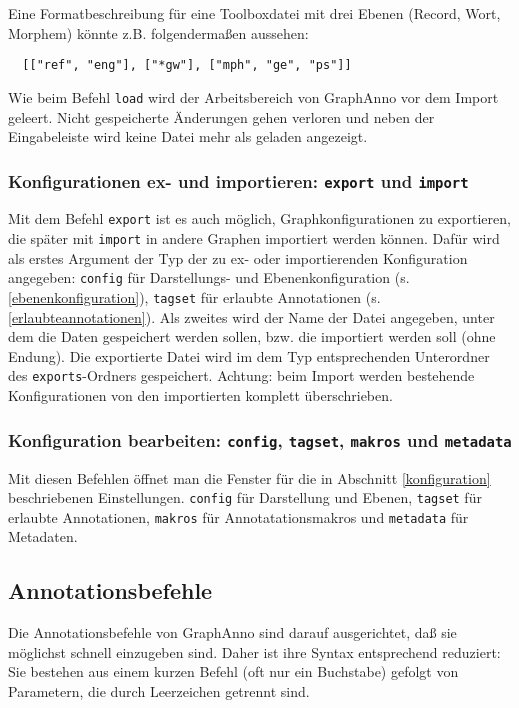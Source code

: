 \documentclass[12pt]{scrartcl}
\begin{document}
Eine Formatbeschreibung für eine Toolboxdatei mit drei Ebenen (Record, Wort, Morphem) könnte z.B. folgendermaßen aussehen:
\begin{verbatim}
  [["ref", "eng"], ["*gw"], ["mph", "ge", "ps"]]
\end{verbatim}

Wie beim Befehl \texttt{load} wird der Arbeitsbereich von GraphAnno vor dem Import geleert. Nicht gespeicherte Änderungen gehen verloren und neben der Eingabeleiste wird keine Datei mehr als geladen angezeigt.


\subsubsection{Konfigurationen ex- und importieren: \texttt{export} und \texttt{import}}

Mit dem Befehl \texttt{export} ist es auch möglich, Graphkonfigurationen zu exportieren, die später mit \texttt{import} in andere Graphen importiert werden können. Dafür wird als erstes Argument der Typ der zu ex- oder importierenden Konfiguration angegeben: \texttt{config} für Darstellungs- und Ebenenkonfiguration (s. \ref{ebenenkonfiguration}), \texttt{tagset} für erlaubte Annotationen (s. \ref{erlaubteannotationen}). Als zweites wird der Name der Datei angegeben, unter dem die Daten gespeichert werden sollen, bzw. die importiert werden soll (ohne Endung). Die exportierte Datei wird im dem Typ entsprechenden Unterordner des \texttt{exports}-Ordners gespeichert. Achtung: beim Import werden bestehende Konfigurationen von den importierten komplett überschrieben.


\subsubsection{Konfiguration bearbeiten: \texttt{config}, \texttt{tagset}, \texttt{makros} und \texttt{metadata}}

Mit diesen Befehlen öffnet man die Fenster für die in Abschnitt \ref{konfiguration} beschriebenen Einstellungen. \texttt{config} für Darstellung und Ebenen, \texttt{tagset} für erlaubte Annotationen, \texttt{makros} für Annotatationsmakros und \texttt{metadata} für Metadaten.


\subsection{Annotationsbefehle}\label{annotationsbefehle}

Die Annotationsbefehle von GraphAnno sind darauf ausgerichtet, daß sie möglichst schnell einzugeben sind. Daher ist ihre Syntax entsprechend reduziert: Sie bestehen aus einem kurzen Befehl (oft nur ein Buchstabe) gefolgt von Parametern, die durch Leerzeichen getrennt sind.
\end{document}
